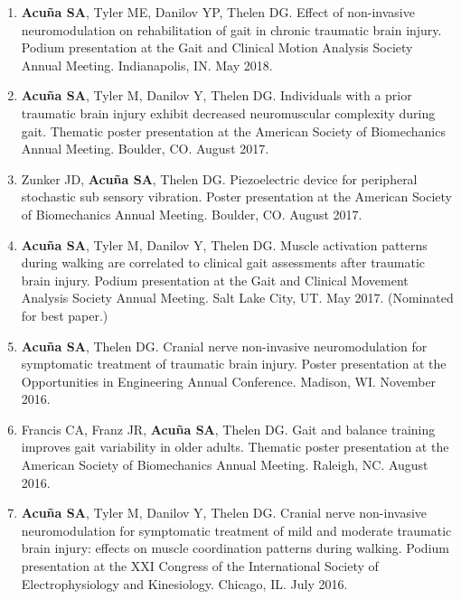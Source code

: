 \documentclass[letterpaper, 10pt]{article}
\begin{document}
\begin{enumerate}
    \item \textbf{Acuña SA}, Tyler ME, Danilov YP, Thelen DG. Effect of non-invasive neuromodulation on rehabilitation of gait in chronic traumatic brain injury. Podium presentation at the Gait and Clinical Motion Analysis Society Annual Meeting. Indianapolis, IN. May 2018.
    \item \textbf{Acuña SA}, Tyler M, Danilov Y, Thelen DG. Individuals with a prior traumatic brain injury exhibit decreased neuromuscular complexity during gait. Thematic poster presentation at the American Society of Biomechanics Annual Meeting. Boulder, CO. August 2017.
    \item Zunker JD, \textbf{Acuña SA}, Thelen DG. Piezoelectric device for peripheral stochastic sub sensory vibration. Poster presentation at the American Society of Biomechanics Annual Meeting. Boulder, CO. August 2017.
    \item \textbf{Acuña SA}, Tyler M, Danilov Y, Thelen DG. Muscle activation patterns during walking are correlated to clinical gait assessments after traumatic brain injury. Podium presentation at the Gait and Clinical Movement Analysis Society Annual Meeting. Salt Lake City, UT. May 2017. (Nominated for best paper.)
    \item \textbf{Acuña SA}, Thelen DG. Cranial nerve non-invasive neuromodulation for symptomatic treatment of traumatic brain injury. Poster presentation at the Opportunities in Engineering Annual Conference. Madison, WI. November 2016.
    \item Francis CA, Franz JR, \textbf{Acuña SA}, Thelen DG. Gait and balance training improves gait variability in older adults. Thematic poster presentation at the American Society of Biomechanics Annual Meeting. Raleigh, NC. August 2016.
    \item \textbf{Acuña SA}, Tyler M, Danilov Y, Thelen DG. Cranial nerve non-invasive neuromodulation for symptomatic treatment of mild and moderate traumatic brain injury: effects on muscle coordination patterns during walking. Podium presentation at the XXI Congress of the International Society of Electrophysiology and Kinesiology. Chicago, IL. July 2016.

\end{enumerate}
\end{document}
